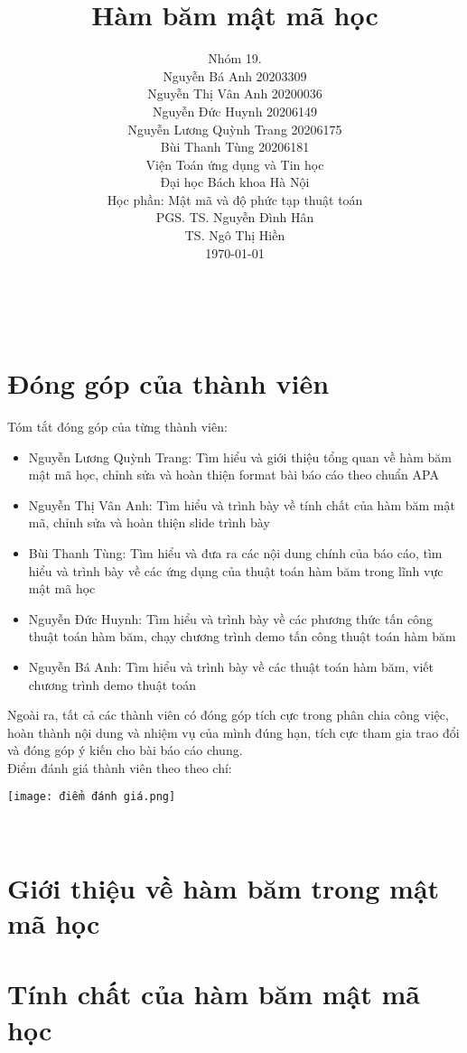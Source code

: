 \documentclass[man]{apa7}
\title{Hàm băm mật mã học}
\author{
Nhóm 19.\\
Nguyễn Bá Anh 20203309\\
Nguyễn Thị Vân Anh 20200036\\
Nguyễn Đức Huynh 20206149\\
Nguyễn Lương Quỳnh Trang 20206175\\
Bùi Thanh Tùng 20206181\\[0.5cm]
Viện Toán ứng dụng và Tin học \\
Đại học Bách khoa Hà Nội\\[0.5cm]
Học phần: Mật mã và độ phức tạp thuật toán\\
PGS. TS. Nguyễn Đình Hân\\ 
TS. Ngô Thị Hiền\\[0.5cm]
\today
}
\affiliation{}
\begin{document}
\maketitle
\setlength{\leftmargin}{-0.5mm}\tableofcontents
\newpage\,\thispagestyle{empty}

\newpage
\section*{Đóng góp của thành viên}
\setcounter{page}{4}
\noindent Tóm tắt đóng góp của từng thành viên:
\begin{itemize}
    \item Nguyễn Lương Quỳnh Trang: Tìm hiểu và giới thiệu tổng quan về hàm băm mật mã học, chỉnh sửa và hoàn thiện format bài báo cáo theo chuẩn APA
    
    \item Nguyễn Thị Vân Anh: Tìm hiểu và trình bày về tính chất của hàm băm mật mã, chỉnh sửa và hoàn thiện slide trình bày
    
    \item Bùi Thanh Tùng: Tìm hiểu và đưa ra các nội dung chính của báo cáo, tìm hiểu và trình bày về các ứng dụng của thuật toán hàm băm trong lĩnh vực mật mã học
    \item Nguyễn Đức Huynh: Tìm hiểu và trình bày về các phương thức tấn công thuật toán hàm băm, chạy chương trình demo tấn công thuật toán hàm băm
    \item Nguyễn Bá Anh: Tìm hiểu và trình bày về các thuật toán hàm băm, viết chương trình demo thuật toán
\end{itemize}
\noindent Ngoài ra, tất cả các thành viên có đóng góp tích cực trong phân chia công việc, hoàn thành nội dung và nhiệm vụ của mình đúng hạn, tích cực tham gia trao đổi và đóng góp ý kiến cho bài báo cáo chung.\\
\noindent Điểm đánh giá thành viên theo theo chí:
\begin{center}
    \texttt{[image: điểm đánh giá.png]}
\end{center}
\newpage\,\thispagestyle{empty}

\newpage
\section{Giới thiệu về hàm băm trong mật mã học}
\setcounter{page}{5}

\newpage
\section{Tính chất của hàm băm mật mã học}

\end{document}
